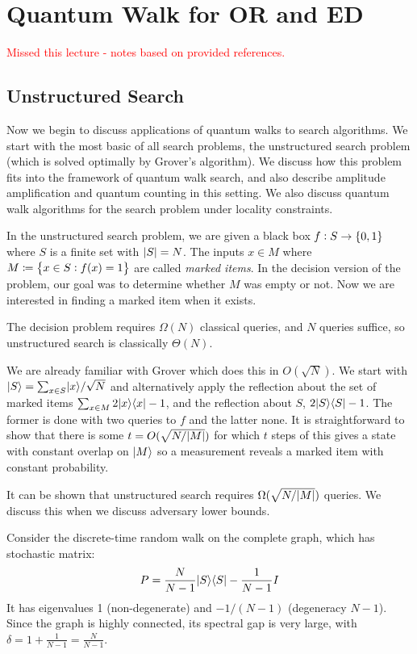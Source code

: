 \section{Quantum Walk for OR and ED}
\textcolor{red}{Missed this lecture - notes based on provided references.}
\subsection*{Unstructured Search}
Now we begin to discuss applications of quantum walks to search algorithms. We start with the most basic of all search problems, the unstructured search problem (which is solved optimally by Grover's algorithm). We discuss how this problem fits into the framework of quantum walk search, and also describe amplitude amplification and quantum counting in this setting. We also discuss quantum walk algorithms for the search problem under locality constraints.

In the unstructured search problem, we are given a black box $f: S \to \set{0, 1}$ where $S$ is a finite set with $\lvert S \rvert = N$. The inputs $x \in M$ where $M \coloneqq \set{x \in S: f(x) = 1}$ are called \emph{marked items}. In the decision version of the problem, our goal was to determine whether $M$ was empty or not. Now we are interested in finding a marked item when it exists.

The decision problem requires $\Omega(N)$ classical queries, and $N$ queries suffice, so unstructured search is classically $\Theta(N)$.

We are already familiar with Grover which does this in $O(\sqrt{N})$. We start with $\lvert S \rangle = \sum_{x \in S}\lvert x \rangle/\sqrt{N}$ and alternatively apply the reflection about the set of marked items $\sum_{x \in M}2\lvert x \rangle \langle x \rvert - 1$, and the reflection about $S$, $2\lvert S \rangle \langle S \rvert - 1$. The former is done with two queries to $f$ and the latter none. It is straightforward to show that there is some $t = O(\sqrt{N/\lvert M \rvert})$ for which $t$ steps of this gives a state with constant overlap on $\lvert M \rangle$ so a measurement reveals a marked item with constant probability.

It can be shown that unstructured search requires $\Omega(\sqrt{N/\lvert M \rvert})$ queries. We discuss this when we discuss adversary lower bounds.

Consider the discrete-time random walk on the complete graph, which has stochastic matrix:
\begin{equation}
    P = \frac{N}{N-1}\lvert S \rangle \langle S \rvert - \frac{1}{N-1}I
\end{equation}
It has eigenvalues 1 (non-degenerate) and $-1/(N-1)$ (degeneracy $N-1$). Since the graph is highly connected, its spectral gap is very large, with $\delta = 1 + \frac{1}{N-1} = \frac{N}{N-1}$.

